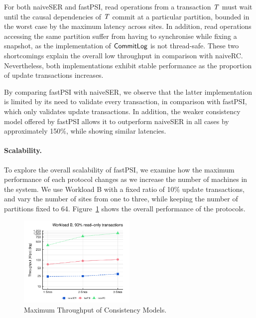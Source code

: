For both naiveSER and fastPSI, read operations from a transaction $\mathit{T}$ must wait until the causal dependencies of $\mathit{T}$ commit at a particular partition, bounded in the worst case by the maximum latency across sites. In addition, read operations accessing the same partition suffer from having to synchronise while fixing a snapshot, as the implementation of $\mathsf{CommitLog}$ is not thread-safe. These two shortcomings explain the overall low throughput in comparison with naiveRC. Nevertheless, both implementations exhibit stable performance as the proportion of update transactions increases.

By comparing fastPSI with naiveSER, we observe that the latter implementation is limited by its need to validate every transaction, in comparison with fastPSI, which only validates update transactions. In addition, the weaker consistency model offered by fastPSI allows it to outperform naiveSER in all cases by approximately 150\%, while showing similar latencies.

\paragraph{Scalability.} To explore the overall scalability of fastPSI, we examine how the maximum performance of each protocol changes as we increase the number of machines in the system. We use Workload B with a fixed ratio of 10\% update transactions, and vary the number of sites from one to three, while keeping the number of partitions fixed to 64. Figure~\ref{fig:site_bench} shows the overall performance of the protocols.

\begin{figure}[h]
\begin{center}
\includegraphics[width=0.5\textwidth]{figures/sites_bench.pdf}
\vspace{-1cm}
\end{center}
\caption{Maximum Throughput of Consistency Models.}
\label{fig:site_bench}
\end{figure}

